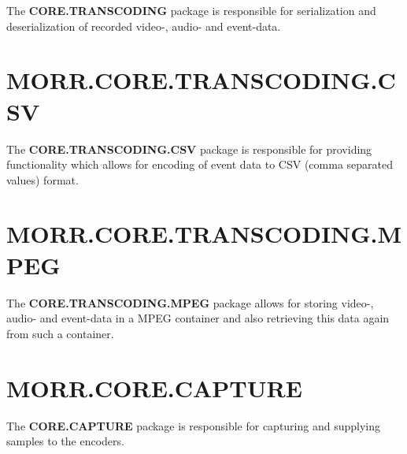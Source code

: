The \textbf{CORE.TRANSCODING} package is responsible for serialization and deserialization of recorded video-, audio- and event-data.

\begin{packif}
\end{packif}

\begin{packclass}
\end{packclass}

\begin{packpack}
\end{packpack}

\section*{MORR.CORE.TRANSCODING.CSV}
The \textbf{CORE.TRANSCODING.CSV} package is responsible for providing functionality which allows for encoding of event data to CSV (comma separated values) format.

\begin{packclass}
\end{packclass}

\section*{MORR.CORE.TRANSCODING.MPEG}
The \textbf{CORE.TRANSCODING.MPEG} package allows for storing video-, audio- and event-data in a MPEG container and also retrieving this data again from such a container.

\begin{packclass}
\end{packclass}

\section*{MORR.CORE.CAPTURE}

The \textbf{CORE.CAPTURE} package is responsible for capturing and supplying samples to the encoders.

